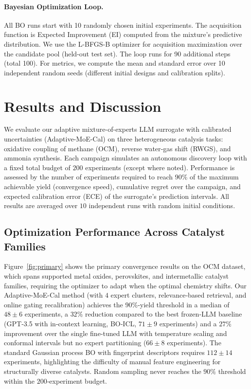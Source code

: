 \documentclass{article}
\begin{document}
\paragraph{Bayesian Optimization Loop.} All BO runs start with 10 randomly chosen initial experiments. The acquisition function is Expected Improvement (EI) computed from the mixture's predictive distribution. We use the L-BFGS-B optimizer for acquisition maximization over the candidate pool (held-out test set). The loop runs for 90 additional steps (total 100). For metrics, we compute the mean and standard error over 10 independent random seeds (different initial designs and calibration splits).

\section{Results and Discussion}

We evaluate our adaptive mixture-of-experts LLM surrogate with calibrated uncertainties (Adaptive-MoE-Cal) on three heterogeneous catalysis tasks: oxidative coupling of methane (OCM), reverse water‑gas shift (RWGS), and ammonia synthesis. Each campaign simulates an autonomous discovery loop with a fixed total budget of $200$ experiments (except where noted). Performance is assessed by the number of experiments required to reach $90\%$ of the maximum achievable yield (convergence speed), cumulative regret over the campaign, and expected calibration error (ECE) of the surrogate’s prediction intervals. All results are averaged over $10$ independent runs with random initial conditions.

\subsection{Optimization Performance Across Catalyst Families}

Figure~\ref{fig:primary} shows the primary convergence results on the OCM dataset, which spans supported metal oxides, perovskites, and intermetallic catalyst families, requiring the optimizer to adapt when the optimal chemistry shifts. Our Adaptive-MoE-Cal method (with $4$ expert clusters, relevance‑based retrieval, and online gating recalibration) achieves the $90\%$‑yield threshold in a median of $48 \pm 6$ experiments, a $32\%$ reduction compared to the best frozen‑LLM baseline (GPT‑3.5 with in‑context learning, BO‑ICL, $71 \pm 9$ experiments) and a $27\%$ improvement over the single fine‑tuned LLM with temperature scaling and conformal intervals but no expert partitioning ($66 \pm 8$ experiments). The standard Gaussian process BO with fingerprint descriptors requires $112 \pm 14$ experiments, highlighting the difficulty of manual feature engineering for structurally diverse catalysts. Random sampling never reaches the $90\%$ threshold within the $200$‑experiment budget.
\end{document}
